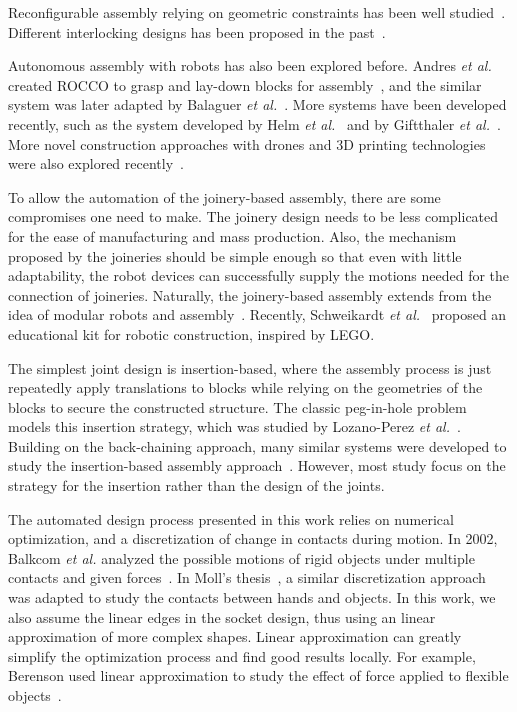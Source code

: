 \documentclass[letterpaper, 10 pt, conference]{ieeeconf}
\begin{document}
Reconfigurable assembly relying on geometric constraints has been well studied~\cite{song2012recursive, song2017reconfigurable, songcofifab, fu2015computational, Wang-2018-DESIA}. Different interlocking designs has been proposed in the past~\cite{Yao:2017:IDS:3068851.3054740}. 

Autonomous assembly with robots has also been explored before. Andres {\em et al.} created ROCCO to grasp and lay-down blocks for assembly~\cite{andres1994first}, and the similar system was later adapted by Balaguer {\em et al.}~\cite{balaguer1996site}. More systems have been developed recently, such as the system developed by Helm {\em et al.}~\cite{helm2012mobile} and by Giftthaler {\em et al.}~\cite{giftthaler2017mobile}. More novel construction approaches with drones and 3D printing technologies were also explored recently~\cite{willmann2012aerial, augugliaro2014flight, lindsey2011construction, augugliaro2013building, keating2017toward, winsun3dprint}. 

To allow the automation of the joinery-based assembly, there are some compromises one need to make. The joinery design needs to be less complicated for the ease of manufacturing and mass production. Also, the mechanism proposed by the joineries should be simple enough so that even with little adaptability, the robot devices can successfully supply the motions needed for the connection of joineries. Naturally, the joinery-based assembly extends from the idea of modular robots and assembly~\cite{rus2001crystalline, white2005three, romanishin2013m, daudelin2017integrated}. Recently, Schweikardt {\em et al.}~\cite{schweikardt2006roblocks} proposed an educational kit for robotic construction, inspired by LEGO. 

The simplest joint design is insertion-based, where the assembly process is just repeatedly apply translations to blocks while relying on the geometries of the blocks to secure the constructed structure. The classic peg-in-hole problem models this insertion strategy, which was studied by Lozano-Perez {\em et al.}~\cite{Lozano-Perez1984}. Building on the back-chaining approach, many similar systems were developed to study the insertion-based assembly approach~\cite{Mason86, Bruyninckx95, ZhangZOH04}. However, most study focus on the strategy for the insertion rather than the design of the joints. 

The automated design process presented in this work relies on numerical optimization, and a discretization of change in contacts during motion. In 2002, Balkcom {\em et al.} analyzed the possible motions of rigid objects under multiple contacts and given forces~\cite{Balkcom2002c}. In Moll's thesis~\cite{Moll2002}, a similar discretization approach was adapted to study the contacts between hands and objects. In this work, we also assume the linear edges in the socket design, thus using an linear approximation of more complex shapes. Linear approximation can greatly simplify the optimization process and find good results locally. For example, Berenson used linear approximation to study the effect of force applied to flexible objects~\cite{Berenson2013-deformable}. 
\end{document}
